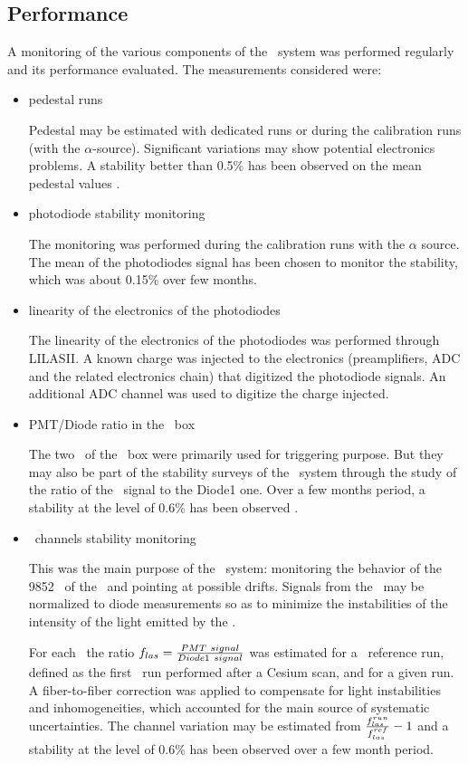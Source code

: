 \subsection{Performance}
A monitoring of the various components of the \lasi~system was performed regularly and its performance evaluated.  The measurements considered were:
\begin{itemize}
\item{pedestal runs} 
	
	Pedestal may be estimated with dedicated runs or during the calibration runs (with the $\alpha$-source). Significant variations may show potential electronics problems. A stability better than 0.5\% has been observed on the mean pedestal values \cite{ref:laserb}.
\item{photodiode stability monitoring}
	
	The monitoring was performed during the calibration runs with the $\alpha$ source. The mean of the photodiodes signal has been chosen to monitor the stability, which was about 0.15\% over few months.
	
\item{linearity of the electronics of the photodiodes}
	
	The linearity of the electronics of the photodiodes was performed through {\sc LILASII}. A known charge was injected to the electronics (preamplifiers, ADC and the related electronics chain) that digitized the photodiode signals. An additional ADC channel was used to digitize the charge injected. 
\item{PMT/Diode ratio in the \las~box}
	
	The two \pmts~of the \las~box were primarily used for triggering purpose. But they may also be part of the stability surveys of the \las~system through the study of the ratio of the \pmts~signal to the Diode1 one. Over a few months period, a stability at the level of 0.6\% has been observed \cite{ref:laserb}.
	
\item{\tilecal~channels stability monitoring}
	
	This was the main purpose of the \las~system: monitoring the behavior of the 9852 \pmts~of the \tilecal~and pointing at possible drifts. Signals from the \pmts~may be normalized to diode measurements so as to minimize the instabilities of the intensity of the light emitted by the \las.  \par
	For each \pmt~the ratio $f_{las}={{PMT~signal}\over{Diode1~signal}}$ was estimated for a \las~reference run, defined as the first \las~run performed after a Cesium scan, and for a given run. A fiber-to-fiber correction was applied to compensate for light instabilities and inhomogeneities, which accounted for the main source of systematic uncertainties. The channel variation may be estimated from ${{f_{las}^{run}}\over{f_{las}^{ref}}}-1$ and a stability at the level of 0.6\% has been observed over a few month period.
	
	
\end{itemize}


